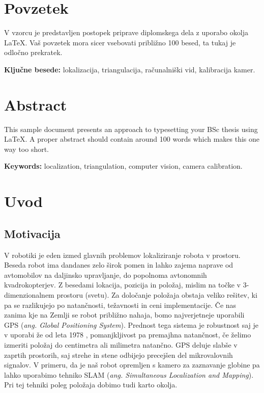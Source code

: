 \documentclass[a4paper, 12pt]{book}
\newcommand{\tkeywords}{lokalizacija, triangulacija, računalniški vid, kalibracija kamer}
\newcommand{\tkeywordsEn}{localization, triangulation, computer vision, camera calibration}
\newcommand{\clearemptydoublepage}{\newpage{\pagestyle{empty}\cleardoublepage}}
\begin{document}
\clearemptydoublepage

\chapter*{Povzetek}
V vzorcu je predstavljen postopek priprave diplomskega dela z uporabo okolja \LaTeX. Vaš povzetek mora sicer vsebovati približno 100 besed, ta tukaj je odločno prekratek.
\bigskip

\noindent\textbf{Ključne besede:} \tkeywords.
\clearemptydoublepage

\chapter*{Abstract}
This sample document presents an approach to typesetting your BSc thesis using \LaTeX. A proper abstract should contain around 100 words which makes this one way too short.
\bigskip

\noindent\textbf{Keywords:} \tkeywordsEn.
\clearemptydoublepage

\mainmatter
\setcounter{page}{1}
\pagestyle{fancy}

\chapter{Uvod}
\section{Motivacija}
V robotiki je eden izmed glavnih problemov lokaliziranje robota v prostoru. Beseda robot ima dandanes zelo širok pomen in lahko zajema naprave od avtomobilov na daljinsko upravljanje, do popolnoma avtonomnih kvadrokopterjev. Z besedami lokacija, pozicija in položaj, mislim na točke v 3-dimenzionalnem prostoru (svetu). Za določanje položaja obstaja veliko rešitev, ki pa se razlikujejo po natančnosti, težavnosti in ceni implementacije. Če nas zanima kje na Zemlji se robot približno nahaja, bomo najverjetneje uporabili GPS (\emph{ang. Global Positioning System}). Prednost tega sistema je robustnost saj je v uporabi že od leta 1978 \cite{wiki:gps}, pomanjkljivost pa premajhna natančnost, če želimo izmeriti položaj do centimetra ali milimetra natančno. GPS deluje slabše v zaprtih prostorih, saj strehe in stene odbijejo precejšen del mikrovalovnih signalov. V primeru, da je naš robot opremljen s kamero za zaznavanje globine pa lahko uporabimo tehniko SLAM (\emph{ang. Simultaneous Localization and Mapping}). Pri tej tehniki poleg položaja dobimo tudi karto okolja.
\end{document}
